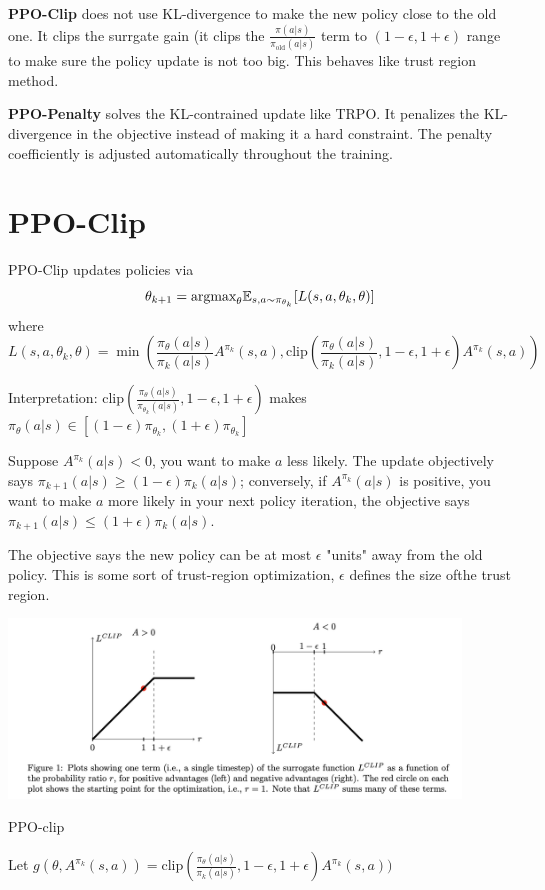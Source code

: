 \documentclass{article}
\begin{document}
\textbf{PPO-Clip} does not use KL-divergence to make the new policy 
close to the old one. It clips the surrgate gain (it clips the 
$\frac{\pi(a|s)}{\pi_{\text{old}}(a|s)}$ term to $(1 - \epsilon, 
1 + \epsilon)$ range to make sure the policy update is not too big. 
This behaves like trust region method.

\textbf{PPO-Penalty} solves the KL-contrained update like TRPO. It 
penalizes the KL-divergence in the objective instead of making it a 
hard constraint. The penalty coefficiently is adjusted automatically 
throughout the training. 


\section{PPO-Clip}
PPO-Clip updates policies via
\[
\theta_{k+1} = \text{argmax}_{\theta}\mathbb{E}_{s, a\sim \pi_{\theta_k}}
[L(s, a, \theta_k, \theta)]
\]
where 
\[
L(s, a, \theta_k, \theta) = \min(
\frac{\pi_{\theta}(a|s)}{\pi_k(a|s)}A^{\pi_k}(s, a), \text{clip}(
\frac{\pi_{\theta}(a|s)}{\pi_k(a|s)}, 1-\epsilon, 1 + \epsilon)
A^{\pi_k}(s, a))
\]

Interpretation:
$\text{clip}(\frac{\pi_{\theta}(a|s)}{\pi_{\theta_k}(a|s)}, 
1-\epsilon, 1 + \epsilon)$ makes 
$\pi_{\theta}(a|s) \in [(1-\epsilon)\pi_{\theta_k}, (1+\epsilon)
\pi_{\theta_k}]$

Suppose $A^{\pi_k}(a|s) <0$, you want to make $a$ less likely. The 
update objectively says $\pi_{k+1}(a|s) \geq (1-\epsilon)\pi_k(a|s)$;
conversely, if $A^{\pi_k}(a|s)$ is positive, you want to make $a$
more likely in your next policy iteration, the objective says
$\pi_{k+1}(a|s) \leq (1 + \epsilon)\pi_k(a|s)$.

The objective says the new policy can be at most $\epsilon$ "units" 
away from the old policy. This is some sort of trust-region 
optimization, $\epsilon$ defines the size ofthe trust region.  

\includegraphics[width=12cm]{ppo_clip}

\begin{algorithm}[H]
\caption{PPO-clip}
\label{alg1}
\end{algorithm}
Let $g(\theta, A^{\pi_k}(s,a)) = \text{clip}(
\frac{\pi_{\theta}(a|s)}{\pi_k(a|s)}, 1-\epsilon, 1 + \epsilon)
A^{\pi_k}(s, a))$
\end{document}

